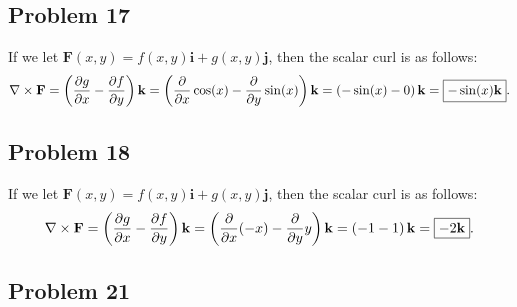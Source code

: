\documentclass[11pt]{article}
\renewcommand{\vec}[1]{\mathbf{#1}}
\renewcommand{\grad}{\nabla}
\begin{document}

\subsection*{Problem 17}

If we let $\vec{F}(x, y) = f(x, y) \vec{i} + g(x, y) \vec{j}$, then the scalar curl is as follows:
\[
	\grad \times \vec{F} = \left( \pdv{g}{x} - \pdv{f}{y} \right) \vec{k} = \left( \pdv{x} \cos(x) - \pdv{y} \sin(x) \right) \vec{k} = \left( -\sin(x) - 0 \right) \vec{k} = \boxed{- \sin(x) \vec{k}}.
\]


\subsection*{Problem 18}

If we let $\vec{F}(x, y) = f(x, y) \vec{i} + g(x, y) \vec{j}$, then the scalar curl is as follows:
\[
	\grad \times \vec{F} = \left( \pdv{g}{x} - \pdv{f}{y} \right) \vec{k} = \left( \pdv{x} (-x) - \pdv{y} y \right) \vec{k} = \left( -1 - 1 \right) \vec{k} = \boxed{-2 \vec{k}}.
\]


\subsection*{Problem 21}
\end{document}
